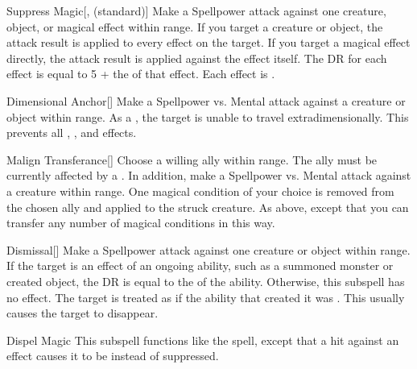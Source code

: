 \begin{ability}[\nth{1}]{Suppress Magic}[,  (standard)]
Make a Spellpower attack against one creature, object, or magical effect within \rngmed range.
If you target a creature or object, the attack result is applied to every  effect on the target.
If you target a magical effect directly, the attack result is applied against the effect itself.
The DR for each effect is equal to 5 + the  of that effect.
\hit Each effect is .
\end{ability}
\vspace{0.25em}


\begin{ability}[\nth{2}]{Dimensional Anchor}[]
Make a Spellpower vs. Mental attack against a creature or object within \rngmed range.
\hit As a , the target is unable to travel extradimensionally.
This prevents all , , and  effects.
\end{ability}
\vspace{0.25em}


\begin{ability}[\nth{2}]{Malign Transferance}[]
Choose a willing ally within \rngmed range.
The ally must be currently affected by a  .
In addition, make a Spellpower vs. Mental attack against a creature within \rngmed range.
\hit One magical condition of your choice is removed from the chosen ally and applied to the struck creature.
\crit As above, except that you can transfer any number of magical conditions in this way.
\end{ability}
\vspace{0.25em}


\begin{ability}[\nth{3}]{Dismissal}[]
Make a Spellpower attack against one creature or object within \rngmed range.
If the target is an effect of an ongoing  ability, such as a summoned monster or created object, the DR is equal to the  of the ability.
Otherwise, this subspell has no effect.
\hit The target is treated as if the ability that created it was .
This usually causes the target to disappear.
\end{ability}
\vspace{0.25em}


\begin{ability}[\nth{3}]{Dispel Magic}
This subspell functions like the  spell, except that a hit against an effect causes it to be  instead of suppressed.
\end{ability}
\vspace{0.25em}


